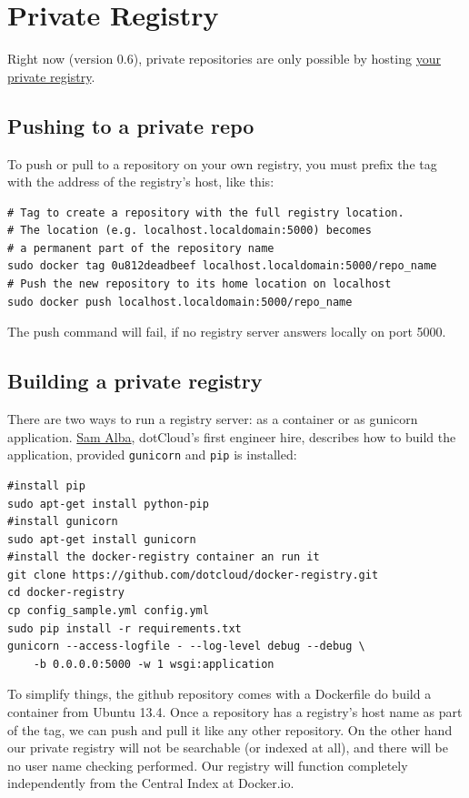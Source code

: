 \documentclass[captions=tableheading]{article}
\begin{document}
\section{Private Registry}
\label{sec-3}

Right now (version 0.6), private repositories are only possible by hosting \href{https://github.com/dotcloud/docker-registry}{your private registry}. 
\subsection{Pushing to a private repo}
\label{sec-3-1}

To push or pull to a repository on your own registry, you must prefix the tag with the address of the registry’s host, like this:

\begin{verbatim}
# Tag to create a repository with the full registry location.
# The location (e.g. localhost.localdomain:5000) becomes
# a permanent part of the repository name
sudo docker tag 0u812deadbeef localhost.localdomain:5000/repo_name
# Push the new repository to its home location on localhost
sudo docker push localhost.localdomain:5000/repo_name
\end{verbatim}
The push command will fail, if no registry server answers locally on port 5000.
\subsection{Building a private registry}
\label{sec-3-2}

There are two ways to run a registry server: as a container or as gunicorn application. \href{http://blog.docker.io/2013/07/how-to-use-your-own-registry/}{Sam Alba}, dotCloud's first engineer hire, describes how to build the application, provided \texttt{gunicorn} and \texttt{pip} is installed:

\begin{verbatim}
#install pip 
sudo apt-get install python-pip
#install gunicorn
sudo apt-get install gunicorn
#install the docker-registry container an run it
git clone https://github.com/dotcloud/docker-registry.git
cd docker-registry
cp config_sample.yml config.yml
sudo pip install -r requirements.txt
gunicorn --access-logfile - --log-level debug --debug \
    -b 0.0.0.0:5000 -w 1 wsgi:application
\end{verbatim}

To simplify things, the github repository comes with a Dockerfile do build a container from Ubuntu 13.4.
Once a repository has a registry’s host name as part of the tag, we can push and pull it like any other repository. On the other hand our private registry will not be searchable (or indexed at all), and there will be no user name checking performed. Our registry will function completely independently from the Central Index at Docker.io.
\end{document}
